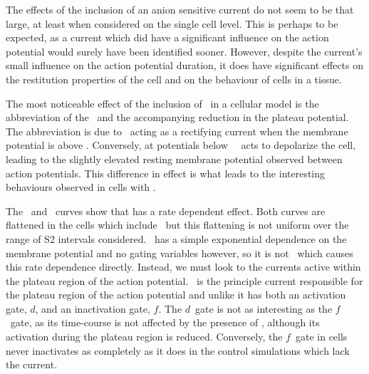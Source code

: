 The effects of the inclusion of an anion sensitive current do not seem to be
that large, at least when considered on the single cell level.  This is perhaps
to be expected, as a current which did have a significant influence on the
action potential would surely have been identified sooner.  However, despite the
current's small influence on the action potential duration, it does have
significant effects on the restitution properties of the cell and on the
behaviour of cells in a tissue.

The most noticeable effect of the inclusion of \ in a cellular model
is the abbreviation of the \apd[50]\ and the accompanying reduction in the
plateau potential.  The abbreviation is due to \ acting as a
rectifying current when the membrane potential is above .   Conversely,
at potentials below \ \ acts to depolarize the cell, leading
to the slightly elevated resting membrane potential observed between action
potentials.  This difference in effect is what leads to the interesting
behaviours observed in cells with .

The \apdr[50]\ and \apdr\ curves show that  has a rate dependent
effect.  Both curves are flattened in the cells which include \, but
this flattening is not uniform over the range of S2 intervals considered.
\ has a simple exponential dependence on the membrane potential and no
gating variables however, so it is not \ which causes this rate
dependence directly.  Instead, we must look to the currents active within the
plateau region of the action potential.  \ is the principle current
responsible for the plateau region of the action potential and unlike 
it has both an activation gate, $d$, and an inactivation gate, $f$.  The $d$\
gate is not as interesting as the $f$\ gate, as its time-course is not affected
by the presence of , although its activation during the plateau region
is reduced.  Conversely, the $f$\ gate in \ii{ANION} cells never inactivates as
completely as it does in the control simulations which lack the current.


